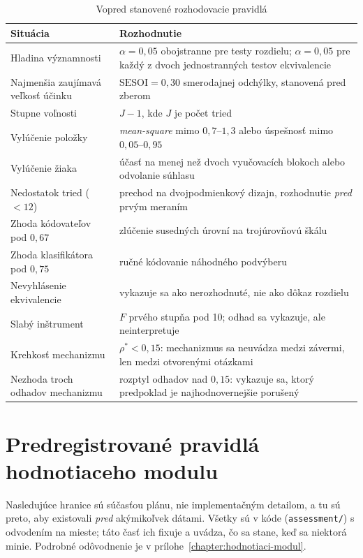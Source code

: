 \begin{table}[H]
\centering
\caption{Vopred stanovené rozhodovacie pravidlá}
\label{tab:rozhodovacie}
\small
\begin{tabularx}{\textwidth}{@{}l X@{}}
\toprule
\textbf{Situácia} & \textbf{Rozhodnutie} \\
\midrule
Hladina významnosti & $\alpha = 0{,}05$ obojstranne pre testy rozdielu; $\alpha = 0{,}05$ pre každý z dvoch jednostranných testov ekvivalencie \\
Najmenšia zaujímavá veľkosť účinku & $\mathrm{SESOI} = 0{,}30$ smerodajnej odchýlky, stanovená pred zberom \\
Stupne voľnosti & $J-1$, kde $J$ je počet tried \\
Vylúčenie položky & \emph{mean-square} mimo $0{,}7$--$1{,}3$ alebo úspešnosť mimo $0{,}05$--$0{,}95$ \\
Vylúčenie žiaka & účasť na menej než dvoch vyučovacích blokoch alebo odvolanie súhlasu \\
Nedostatok tried ($<12$) & prechod na dvojpodmienkový dizajn, rozhodnutie \emph{pred} prvým meraním \\
Zhoda kódovateľov pod $0{,}67$ & zlúčenie susedných úrovní na trojúrovňovú škálu \\
Zhoda klasifikátora pod $0{,}75$ & ručné kódovanie náhodného podvýberu \\
Nevyhlásenie ekvivalencie & vykazuje sa ako nerozhodnuté, nie ako dôkaz rozdielu \\
Slabý inštrument & $F$ prvého stupňa pod 10; odhad sa vykazuje, ale neinterpretuje \\
Krehkosť mechanizmu & $\rho^\ast < 0{,}15$: mechanizmus sa neuvádza medzi závermi, len medzi otvorenými otázkami \\
Nezhoda troch odhadov mechanizmu & rozptyl odhadov nad $0{,}15$: vykazuje sa, ktorý predpoklad je najhodnovernejšie porušený \\
\bottomrule
\end{tabularx}
\end{table}

\section{Predregistrované pravidlá hodnotiaceho modulu}
\label{sec:sap-hodnotenie}

Nasledujúce hranice sú súčasťou plánu, nie implementačným detailom, a tu sú
preto, aby existovali \emph{pred} akýmikoľvek dátami. Všetky sú v kóde
(\texttt{assessment/}) s odvodením na mieste; táto časť ich fixuje a uvádza, čo
sa stane, keď sa niektorá minie. Podrobné odôvodnenie je v
prílohe~\ref{chapter:hodnotiaci-modul}.

